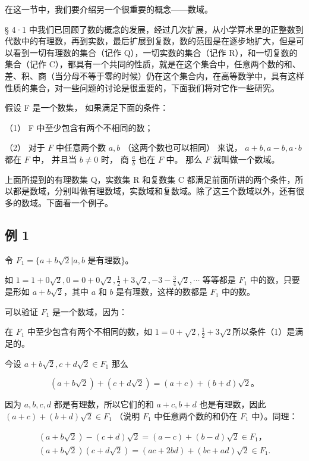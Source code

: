 在这一节中，我们要介绍另一个很重要的概念------数域。

§ 4·1
中我们已回顾了数的概念的发展，经过几次扩展，从小学算术里的正整数到代数中的有理数，再到实数，最后扩展到复数，数的范围是在逐步地扩大，但是可以看到一切有理数的集合（记作
Q），一切实数的集合（记作 R），和一切复数的集合（记作
C），都具有一个共同的性质，就是在这个集合中，任意两个数的和、差、积、商（当分母不等于零的时候）仍在这个集合内，在高等数学中，具有这样性质的集合，对一些问题的讨论是很重要的，下面我们将对它作一些研究。

假设 F 是一个数集， 如果满足下面的条件：

（1） F 中至少包含有两个不相同的数；

（2） 对于 \(F\) 中任意两个数 \(a, b\) （这两个数也可以相同） 来说，
\(a + b, a - b, a \cdot b\) 都在 \(F\) 中， 并且当 \(b \neq 0\) 时， 商
\(\frac{a}{b}\) 也在 \(F\) 中。 那么 \(F\) 就叫做一个数域。

上面所提到的有理数集 Q，实数集 R 和复数集 C
都满足前面所讲的两个条件，所以都是数域，分别叫做有理数域，实数域和复数域。除了这三个数域以外，还有很多的数域。下面看一个例子。

\subsection{例 1}

令 \(F_{1} = \{a + b\sqrt{2} | a, b\) 是有理数\}。

如
\(1 = 1 + 0\sqrt{2}, 0 = 0 + 0\sqrt{2}, \frac{1}{2} + 3\sqrt{2}, -3 - \frac{3}{4}\sqrt{2}, \cdots\)
等等都是 \(F_{1}\) 中的数，只要是形如 \(a + b\sqrt{2}\)，其中 \(a\) 和
\(b\) 是有理数，这样的数都是 \(F_{1}\) 中的数。

可以验证 \(F_{1}\) 是一个数域，因为：

在 \(F_{1}\) 中至少包含有两个不相同的数，如
\(1 = 0 + \sqrt{2}, \frac{1}{2} + 3\sqrt{2}\)所以条件（1）是满足的。

今设 \(a + b\sqrt{2}, c + d\sqrt{2} \in F_1\) 那么

\[
(a+b\sqrt2)+(c+d\sqrt2)=(a+c)+(b+d)\sqrt2\text{。}
\]

因为 \(a, b, c, d\) 都是有理数，所以它们的和 \(a + c, b + d\)
也是有理数，因此 \((a+c)+(b+d)\sqrt2\in F_1\) （说明 \(F_1\)
中任意两个数的和仍在 \(F_1\) 中）。同理：

\[
\begin{array}{l} (a + b \sqrt {2}) - (c + d) \sqrt {2} = (a - c) + (b - d) \sqrt {2} \in F _ {1}\text{，} \\ (a + b \sqrt {2}) (c + d \sqrt {2}) = (a c + 2 b d) + (b c + a d) \sqrt {2} \in F _ {1}. \\ \end{array}
\]

